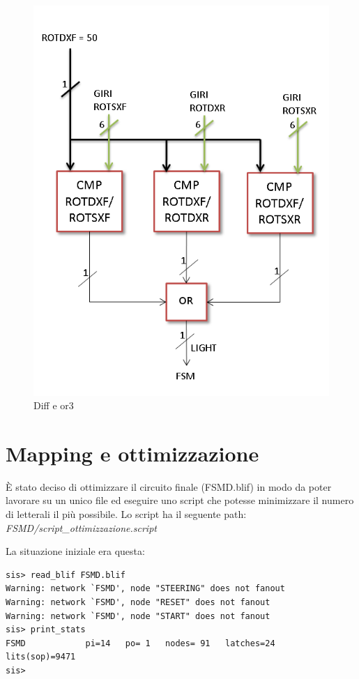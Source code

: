 \documentclass[a4paper,titlepage]{book}
\begin{document}
\begin{figure}[!hb]
\centering
\includegraphics[scale=0.5]{schemi/diff_or3.png}
\caption{Diff e or3}
\end{figure}

\chapter{Mapping e ottimizzazione}

È stato deciso di ottimizzare il circuito finale (FSMD.blif) in modo da poter lavorare su un unico file ed eseguire uno script che potesse minimizzare il numero di letterali il più possibile.
Lo script ha il seguente path: \textit{FSMD/script\_ottimizzazione.script}

La situazione iniziale era questa:

\begin{lstlisting}
sis> read_blif FSMD.blif
Warning: network `FSMD', node "STEERING" does not fanout
Warning: network `FSMD', node "RESET" does not fanout
Warning: network `FSMD', node "START" does not fanout
sis> print_stats
FSMD          	pi=14	po= 1	nodes= 91	latches=24
lits(sop)=9471
sis>
\end{lstlisting}
\end{document}
